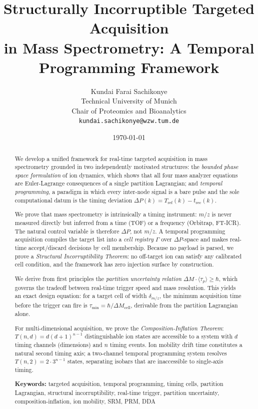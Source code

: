 \documentclass[twocolumn,10pt,a4paper]{article}
\title{\textbf{Structurally Incorruptible Targeted Acquisition\\
in Mass Spectrometry: A Temporal Programming Framework}}
\author{
Kundai Farai Sachikonye\\
Technical University of Munich\\
Chair of Proteomics and Bioanalytics\\
\texttt{kundai.sachikonye@wzw.tum.de}
}
\date{\today}
\theoremstyle{thmstyle}
\theoremstyle{definition}
\theoremstyle{remark}
\newcommand{\DP}{\Delta P}
\newcommand{\Tref}{T_{\mathrm{ref}}}
\newcommand{\trec}{t_{\mathrm{rec}}}
\newcommand{\tp}{\langle\tau_{p}\rangle}
\begin{document}
\maketitle

\begin{abstract}
\noindent
We develop a unified framework for real-time targeted acquisition in
mass spectrometry grounded in two independently motivated structures:
the \emph{bounded phase space formulation} of ion dynamics, which shows
that all four mass analyzer equations are Euler-Lagrange consequences
of a single partition Lagrangian; and \emph{temporal programming}, a
paradigm in which every inter-node signal is a bare pulse and the sole
computational datum is the timing deviation
$\DP(k) = \Tref(k) - \trec(k)$.

We prove that mass spectrometry is intrinsically a timing instrument:
$m/z$ is never measured directly but inferred from a time (TOF) or a
frequency (Orbitrap, FT-ICR). The natural control variable is therefore
$\DP$, not $m/z$. A temporal programming acquisition compiles the target
list into a \emph{cell registry} $\Gamma$ over $\DP$-space and makes
real-time accept/discard decisions by cell membership. Because no payload
is parsed, we prove a \emph{Structural Incorruptibility Theorem}: no
off-target ion can satisfy any calibrated cell condition, and the
framework has zero injection surface by construction.

We derive from first principles the \emph{partition uncertainty relation}
$\Delta M \cdot \tp \geq \hbar$, which governs the tradeoff between
real-time trigger speed and mass resolution. This yields an exact design
equation: for a target cell of width $\delta_{m/z}$, the minimum
acquisition time before the trigger can fire is
$\tau_{\min} = \hbar/\Delta M_{\mathrm{cell}}$, derivable from the
partition Lagrangian alone.

For multi-dimensional acquisition, we prove the
\emph{Composition-Inflation Theorem}:
$T(n,d) = d(d+1)^{n-1}$ distinguishable ion states are accessible to a
system with $d$ timing channels (dimensions) and $n$ timing events. Ion
mobility drift time constitutes a natural second timing axis; a two-channel
temporal programming system resolves $T(n,2) = 2 \cdot 3^{n-1}$ states,
separating isobars that are inaccessible to single-axis timing.

\medskip\noindent\textbf{Keywords:} targeted acquisition, temporal
programming, timing cells, partition Lagrangian, structural incorruptibility,
real-time trigger, partition uncertainty, composition-inflation, ion mobility,
SRM, PRM, DDA
\end{abstract}
\end{document}
